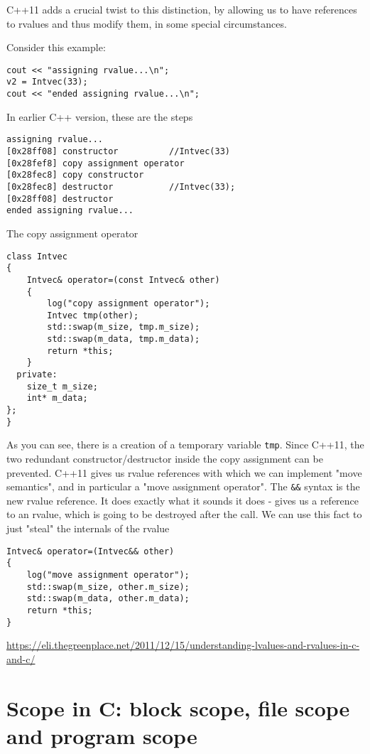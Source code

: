 C++11 adds a crucial twist to this distinction, by allowing us to have
references to rvalues and thus modify them, in some special circumstances.

Consider this example:
\begin{verbatim}
cout << "assigning rvalue...\n";
v2 = Intvec(33);
cout << "ended assigning rvalue...\n";
\end{verbatim}
In earlier C++ version, these are the steps
\begin{verbatim}
assigning rvalue...
[0x28ff08] constructor			//Intvec(33)
[0x28fef8] copy assignment operator
[0x28fec8] copy constructor
[0x28fec8] destructor			//Intvec(33);
[0x28ff08] destructor
ended assigning rvalue...
\end{verbatim}

The copy assignment operator
\begin{lstlisting}
class Intvec
{
    Intvec& operator=(const Intvec& other)
    {
        log("copy assignment operator");
        Intvec tmp(other);
        std::swap(m_size, tmp.m_size);
        std::swap(m_data, tmp.m_data);
        return *this;
    }
  private:
    size_t m_size;
    int* m_data;
};   
}
\end{lstlisting}

As you can see, there is a creation of a temporary variable \verb!tmp!. Since
C++11, the two redundant constructor/destructor inside the copy assignment can
be prevented.
C++11 gives us rvalue references with which we can implement "move semantics",
and in particular a "move assignment operator".
The \verb!&&! syntax is the new rvalue reference. It does exactly what it sounds
it does - gives us a reference to an rvalue, which is going to be destroyed
after the call. We can use this fact to just "steal" the internals of the rvalue

\begin{lstlisting}
Intvec& operator=(Intvec&& other)
{
    log("move assignment operator");
    std::swap(m_size, other.m_size);
    std::swap(m_data, other.m_data);
    return *this;
}
\end{lstlisting}


\url{https://eli.thegreenplace.net/2011/12/15/understanding-lvalues-and-rvalues-in-c-and-c/}


\section{Scope in C: block scope, file scope and program scope}
\label{sec:scopes_in_C}


